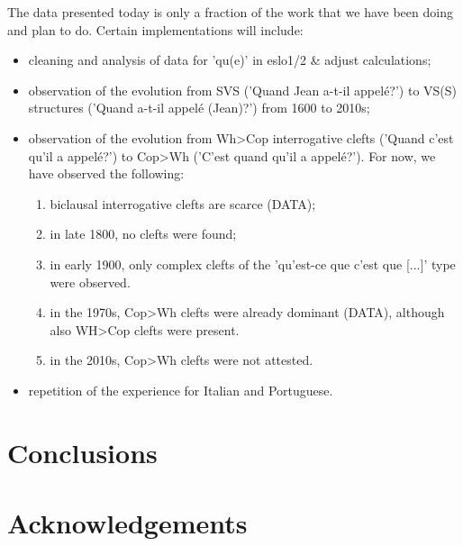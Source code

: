 \documentclass[fleqn,10pt]{wlscirep}
\begin{document}
The data presented today is only a fraction of the work that we have been doing and plan to do. Certain implementations will include:
\begin{itemize}
    \item cleaning and analysis of data for 'qu(e)' in eslo1/2 \& adjust calculations;
    \item \vspace*{-2mm} observation of the evolution from SVS ('Quand Jean a-t-il appelé?') to VS(S) structures ('Quand a-t-il appelé (Jean)?') from 1600 to 2010s; 
    \item \vspace*{-2mm} observation of the evolution from Wh>Cop interrogative clefts ('Quand c'est qu'il a appelé?') to Cop>Wh ('C'est quand qu'il a appelé?'). For now, we have observed the following:
    \begin{enumerate}
        \item \vspace*{-2mm} biclausal interrogative clefts are scarce (DATA);
        \item \vspace*{-2mm} in late 1800, no clefts were found;
        \item \vspace*{-2mm} in early 1900, only complex clefts of the 'qu'est-ce que c'est que [...]' type were observed.
        \item \vspace*{-2mm} in the 1970s, Cop>Wh clefts were already dominant (DATA), although also WH>Cop clefts were present.
        \item \vspace*{-2mm} in the 2010s, Cop>Wh clefts were not attested.
    \end{enumerate}
    \item \vspace*{-2mm} repetition of the experience for Italian and Portuguese. 
\end{itemize}

\section*{Conclusions}




\section*{Acknowledgements}
\end{document}
